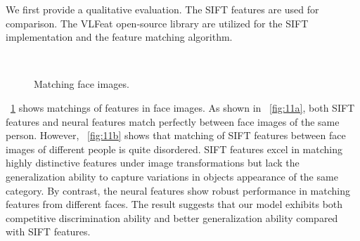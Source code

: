 \documentclass[twocolumn]{article}
\begin{document}
We first provide a qualitative evaluation.
The SIFT features \cite{lowe1999} are used for comparison.
The VLFeat open-source library \cite{vedaldi2010} are utilized for the SIFT implementation and the feature matching algorithm.

\begin{figure}[!t]
\centering
  \\
\caption{Matching face images.}
\label{fig:11}
\end{figure}

\figurename~\ref{fig:11} shows matchings of features in face images.
As shown in \figurename~\ref{fig:11a}, both SIFT features and neural features match perfectly between face images of the same person.
However, \figurename~\ref{fig:11b} shows that matching of SIFT features between face images of different people is quite disordered.
SIFT features excel in matching highly distinctive features under image transformations
but lack the generalization ability to capture variations in objects appearance of the same category.
By contrast, the neural features show robust performance in matching features from different faces.
The result suggests that our model exhibits both competitive discrimination ability and better generalization ability compared with SIFT features.
\end{document}
